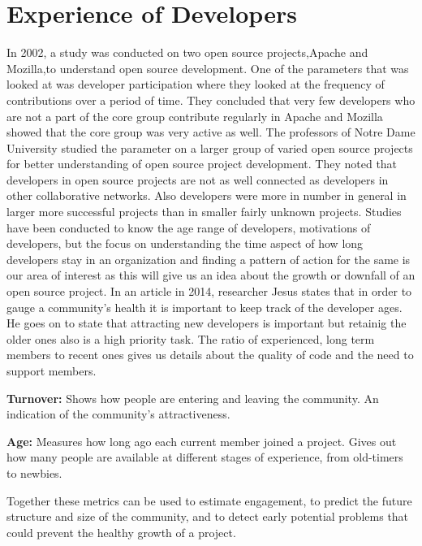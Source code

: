 \documentclass[seploa]{beavtex}
\begin{document}
\section{Experience of Developers}
In 2002, a study was conducted on two open source projects,Apache and Mozilla,to understand open source development. One of the parameters that was looked at was developer participation where they looked at the frequency of contributions over a period of time. They concluded that very few developers who are not a part of the core group contribute regularly in Apache and Mozilla showed that the core group was very active as well\cite{mockus2002}. The professors of Notre Dame University studied the parameter on a larger group of varied open source projects for better understanding of open source project development. They noted that developers in open source projects are not as well connected as developers in other collaborative networks. Also developers were more in number in general in larger more successful projects than in smaller fairly unknown projects\cite{greg2002}. Studies have been conducted to know the age range of developers, motivations of developers, but the focus on understanding the time aspect of how long developers stay in an organization and finding a pattern of action for the same is our area of interest as this will give us an idea about the growth or downfall of an open source project. In an article in 2014, researcher Jesus states that in order to gauge a community's health it is important to keep track of the developer ages. He goes on to state that attracting new developers is important but retainig the older ones also is a high priority task. The ratio of experienced, long term members to recent ones gives us details about the quality of code and the need to support members\cite{jes2014}.

\textbf{Turnover:}
Shows how people are entering and leaving the community. An indication of the community's attractiveness.

\textbf{Age:}
Measures how long ago each current member joined a project. Gives out how many people are available at different stages of experience, from old-timers to newbies.

Together these metrics can be used to estimate engagement, to predict the future structure and size of the community, and to detect early potential problems that could prevent the healthy growth of a project\cite{jes2014}.
\end{document}
